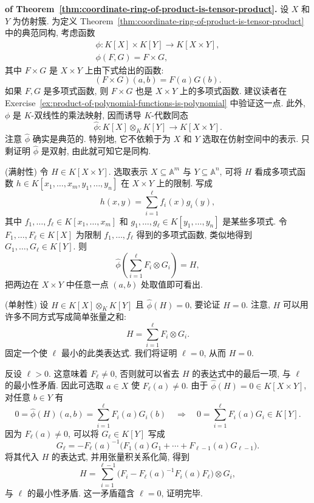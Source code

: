 \begin{Proof}\textbf{of Theorem~\ref{thm:coordinate-ring-of-product-is-tensor-product}.}\quad
设 $X$ 和 $Y$ 为仿射簇. 为定义 Theorem~\ref{thm:coordinate-ring-of-product-is-tensor-product} 中的典范同构, 考虑函数
\[
  \begin{gathered}
    \phi:K[X]\times K[Y]\to K[X\times Y],\\
    \phi(F,G)=F\times G,
  \end{gathered}
\]
其中 $F\times G$ 是 $X\times Y$ 上由下式给出的函数:
\[
  (F\times G)(a,b)=F(a)G(b).
\]
如果 $F,G$ 是多项式函数, 则 $F\times G$ 也是 $X\times Y$ 上的多项式函数. 建议读者在 Exercise~\ref{ex:product-of-polynomial-functions-is-polynomial} 中验证这一点. 此外, $\phi$ 是 $K$-双线性的乘法映射, 因而诱导 $K$-代数同态
\[
  \widehat{\phi}:K[X]\otimes_{K}K[Y]\to K[X\times Y].
\]
注意 $\widehat{\phi}$ 确实是典范的. 特别地, 它不依赖于为 $X$ 和 $Y$ 选取在仿射空间中的表示. 只剩证明 $\widehat{\phi}$ 是双射, 由此就可知它是同构.

(满射性) 令 $H\in K[X\times Y]$. 选取表示 $X\subseteq\mathbb{A}^{m}$ 与 $Y\subseteq\mathbb{A}^{n}$, 可将 $H$ 看成多项式函数 $h\in K[x_{1},\ldots,x_{m},y_{1},\ldots,y_{n}]$ 在 $X\times Y$ 上的限制. 写成
\[
  h(x,y)=\sum_{i=1}^{\ell}f_{i}(x)g_{i}(y),
\]
其中 $f_{1},\ldots,f_{\ell}\in K[x_{1},\ldots,x_{m}]$ 和 $g_{1},\ldots,g_{\ell}\in K[y_{1},\ldots,y_{n}]$ 是某些多项式. 令 $F_{1},\ldots,F_{\ell}\in K[X]$ 为限制 $f_{1},\ldots,f_{\ell}$ 得到的多项式函数, 类似地得到 $G_{1},\ldots,G_{\ell}\in K[Y]$. 则
\[
  \widehat{\phi}\left(\sum_{i=1}^{\ell}F_{i}\otimes G_{i}\right)=H,
\]
把两边在 $X\times Y$ 中任意一点 $(a,b)$ 处取值即可看出.

(单射性) 设 $H\in K[X]\otimes_{K}K[Y]$ 且 $\widehat{\phi}(H)=0$, 要论证 $H=0$. 注意, $H$ 可以用许多不同方式写成简单张量之和:
\[
  H=\sum_{i=1}^{\ell}F_{i}\otimes G_{i}.
\]
固定一个使 $\ell$ 最小的此类表达式. 我们将证明 $\ell=0$, 从而 $H=0$.

反设 $\ell>0$. 这意味着 $F_{\ell}\neq0$, 否则就可以省去 $H$ 的表达式中的最后一项, 与 $\ell$ 的最小性矛盾. 因此可选取 $a\in X$ 使 $F_{\ell}(a)\neq0$. 由于 $\widehat{\phi}(H)=0\in K[X\times Y]$, 对任意 $b\in Y$ 有
\[
  0=\widehat{\phi}(H)(a,b)=\sum_{i=1}^{\ell}F_{i}(a)G_{i}(b)
  \quad\Longrightarrow\quad
  0=\sum_{i=1}^{\ell}F_{i}(a)G_{i}\in K[Y].
\]
因为 $F_{\ell}(a)\neq0$, 可以将 $G_{\ell}\in K[Y]$ 写成
\[
  G_{\ell}=-F_{\ell}(a)^{-1}\bigl(F_{1}(a)G_{1}+\cdots+F_{\ell-1}(a)G_{\ell-1}\bigr).
\]
将其代入 $H$ 的表达式, 并用张量积关系化简, 得到
\[
  H=\sum_{i=1}^{\ell-1}\bigl(F_{i}-F_{\ell}(a)^{-1}F_{i}(a)F_{\ell}\bigr)\otimes G_{i},
\]
与 $\ell$ 的最小性矛盾. 这一矛盾蕴含 $\ell=0$, 证明完毕.
\end{Proof}

